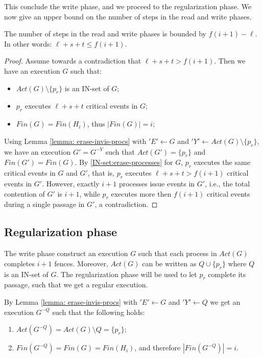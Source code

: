 This conclude the write phase, and we proceed to the regularization phase. We now give an upper bound on the number of steps in the read and write phases.

\begin{claim-section} \label{claim: write-upper-bound}
	The number of steps in the read and write phases is bounded by $f(i+1)-\ell$. In other words: $\ell+s+t \leq f(i+1)$.
\end{claim-section}

\begin{proof}
	Assume towards a contradiction that $\ell+s+t > f(i+1)$. Then we have an execution $G$ such that:
	\begin{itemize}
		\item $Act(G) \setminus \{p_r\}$ is an IN-set of $G$;
		\item $p_r$ executes $\ell+s+t$ critical events in $G$;
		\item $Fin(G) = Fin(H_i)$, thus $|Fin(G)| = i$;
	\end{itemize}

Using Lemma \ref{lemma: erase-invis-procs} with $'E' \leftarrow G$ and $'Y' \leftarrow Act(G) \setminus \{p_r\}$, we have an execution $G' = G^{-Y}$ such that $Act(G') = \{p_r\}$ and $Fin(G') = Fin(G)$. By \ref{IN-set:erase-processes} for $G$, $p_r$ executes the same critical events in $G$ and $G'$, that is, $p_r$ executes $\ell+s+t > f(i+1)$ critical events in $G'$. However, exactly $i+1$ processes issue events in $G'$, i.e., the total contention of $G'$ is $i+1$, while $p_r$ executes more then $f(i+1)$ critical events during a single passage in $G'$, a contradiction.
\end{proof}



\newpage
\subsection{Regularization phase}
The write phase construct an execution $G$ such that each process in $Act(G)$ completes $i+1$ fences. Moreover, $Act(G)$ can be written as $Q \cup \{p_r\}$ where $Q$ is an IN-set of $G$. The regularization phase will be used to let $p_r$ complete its passage, such that we get a regular execution.

By Lemma \ref{lemma: erase-invis-procs} with $'E' \leftarrow G$ and $'Y' \leftarrow Q$ we get an execution $G^{-Q}$ such that the following holds:
\begin{enumerate}
	\item $Act(G^{-Q}) = Act(G) \setminus Q = \{p_r\}$;
	\item $Fin(G^{-Q}) = Fin(G) = Fin(H_i)$, and therefore $|Fin(G^{-Q})| = i$.
\end{enumerate}

